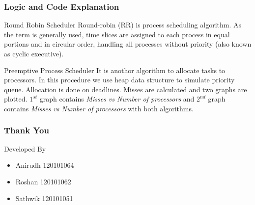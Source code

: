 \documentclass[]{beamer}
\begin{document}
\begin{frame}
\frametitle{Logic and Code Explanation}
\begin{block}{Round Robin Scheduler}
Round-robin (RR) is process scheduling algorithm. As the term is generally used, time slices are assigned to each process in equal portions and in circular order, handling all processes without priority (also known as cyclic executive). 
\end{block}
\begin{block}{Preemptive Process Scheduler}
It is anothor algorithm to allocate tasks to processors. In this procedure we use heap data structure to simulate priority queue. Allocation is done on deadlines. Misses are calculated and two graphs are plotted. $1^{st}$ graph contains \textit{Misses vs Number of processors} and $2^{nd}$ graph contains \textit{Misses vs Number of processors} with both algorithms.
\end{block}
\end{frame}
\begin{frame}
\frametitle{Thank You}
\begin{block}{Developed By}
\begin{itemize}
\item Anirudh 120101064
\item Roshan 120101062
\item Sathwik 120101051
\end{itemize}
\end{block}

\end{frame}
\end{document}
